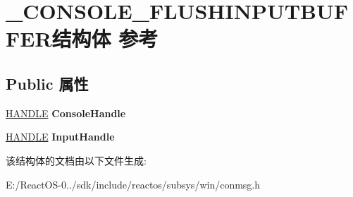 \hypertarget{struct___c_o_n_s_o_l_e___f_l_u_s_h_i_n_p_u_t_b_u_f_f_e_r}{}\section{\+\_\+\+C\+O\+N\+S\+O\+L\+E\+\_\+\+F\+L\+U\+S\+H\+I\+N\+P\+U\+T\+B\+U\+F\+F\+E\+R结构体 参考}
\label{struct___c_o_n_s_o_l_e___f_l_u_s_h_i_n_p_u_t_b_u_f_f_e_r}
\subsection*{Public 属性}
\begin{DoxyCompactItemize}
\item 
\mbox{\label{struct___c_o_n_s_o_l_e___f_l_u_s_h_i_n_p_u_t_b_u_f_f_e_r_a764d0154180d85a5aff58aef63b3dfc7}} 
\hyperlink{interfacevoid}{H\+A\+N\+D\+LE} {\bfseries Console\+Handle}
\item 
\mbox{\label{struct___c_o_n_s_o_l_e___f_l_u_s_h_i_n_p_u_t_b_u_f_f_e_r_a64e1fb37a8723c658befb603dbfdea34}} 
\hyperlink{interfacevoid}{H\+A\+N\+D\+LE} {\bfseries Input\+Handle}
\end{DoxyCompactItemize}


该结构体的文档由以下文件生成\+:\begin{DoxyCompactItemize}
\item 
E\+:/\+React\+O\+S-\/0../sdk/include/reactos/subsys/win/conmsg.\+h\end{DoxyCompactItemize}
